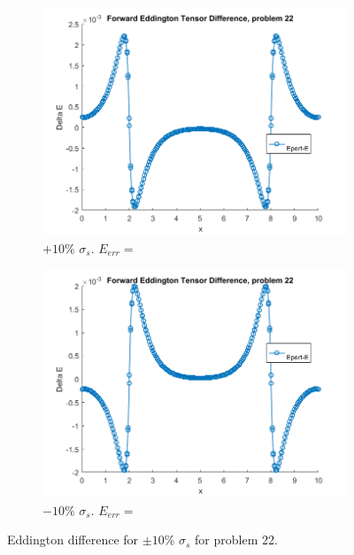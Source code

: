 \documentclass{article}
\begin{document}
\begin{figure}[H]
\centering
\begin{subfigure}{.5\textwidth}
  \centering
  \includegraphics[width=1\linewidth]{p22deltaEdss10.png}
  \caption{$+10\%$ $\sigma_s$. $E_{err}=$}
  \label{fig:sub1}
\end{subfigure}%
\begin{subfigure}{.5\textwidth}
  \centering
  \includegraphics[width=1\linewidth]{p22deltaEdss-10.png}
  \caption{$-10\%$ $\sigma_s$. $E_{err}=$}
  \label{fig:sub2}
\end{subfigure}
\caption{Eddington difference for $\pm10\%$ $\sigma_s$ for problem 22.}
\label{fig:test}
\end{figure}
\end{document}
